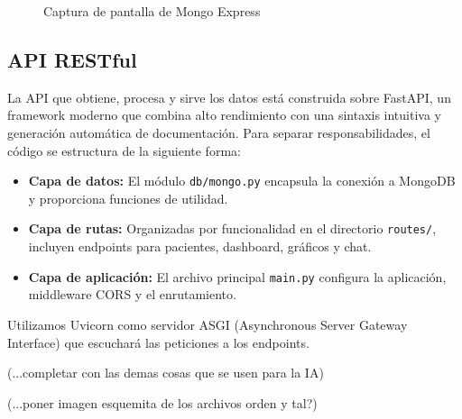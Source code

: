 \begin{figure}[H]
  \centering
  \caption{Captura de pantalla de Mongo Express}
  \label{fig:screenshot2}
\end{figure}


\subsection{API RESTful}

La API que obtiene, procesa y sirve los datos está construida sobre FastAPI, un framework moderno que combina alto rendimiento con una sintaxis intuitiva y generación automática de documentación. Para separar responsabilidades, el código se estructura de la siguiente forma:

\begin{itemize}
\item \textbf{Capa de datos:} El módulo \texttt{db/mongo.py} encapsula la conexión a MongoDB y proporciona funciones de utilidad.
\item \textbf{Capa de rutas:} Organizadas por funcionalidad en el directorio \texttt{routes/}, incluyen endpoints para pacientes, dashboard, gráficos y chat.
\item \textbf{Capa de aplicación:} El archivo principal \texttt{main.py} configura la aplicación, middleware CORS y el enrutamiento.
\end{itemize}

Utilizamos Uvicorn como servidor ASGI (Asynchronous Server Gateway Interface) que escuchará las peticiones a los endpoints. 

(...completar con las demas cosas que se usen para la IA)

(...poner imagen esquemita de los archivos orden y tal?)


